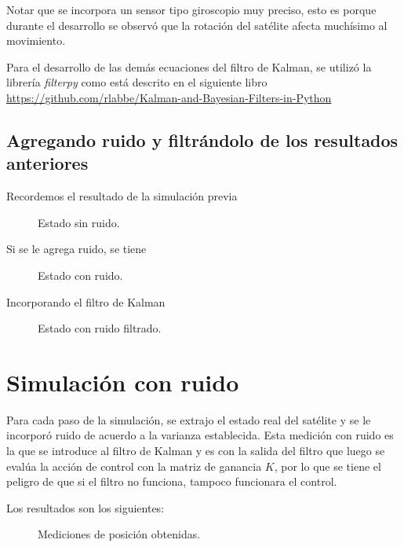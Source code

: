 \documentclass[titlepage, letterpaper]{article}
\begin{document}
Notar que se incorpora un sensor tipo giroscopio muy preciso, esto es porque durante el desarrollo se observó que la rotación del satélite afecta muchísimo al movimiento.

Para el desarrollo de las demás ecuaciones del filtro de Kalman, se utilizó la librería \emph{filterpy} como está descrito en el siguiente libro \url{https://github.com/rlabbe/Kalman-and-Bayesian-Filters-in-Python}

\subsection{Agregando ruido y filtrándolo de los resultados anteriores}

Recordemos el resultado de la simulación previa

\begin{figure}[H]
	\centering
	
	\caption{Estado sin ruido.}
\end{figure}

Si se le agrega ruido, se tiene

\begin{figure}[H]
	\centering
	
	\caption{Estado con ruido.}
\end{figure}

Incorporando el filtro de Kalman

\begin{figure}[H]
	\centering
	
	\caption{Estado con ruido filtrado.}
\end{figure}

\section{Simulación con ruido}

Para cada paso de la simulación, se extrajo el estado real del satélite y se le incorporó ruido de acuerdo a la varianza establecida. Esta medición con ruido es la que se introduce al filtro de Kalman y es con la salida del filtro que luego se evalúa la acción de control con la matriz de ganancia $K$, por lo que se tiene el peligro de que si el filtro no funciona, tampoco funcionara el control.

Los resultados son los siguientes:

\begin{figure}[H]
	\centering
	
	\caption{Mediciones de posición obtenidas.}
\end{figure}
\end{document}
